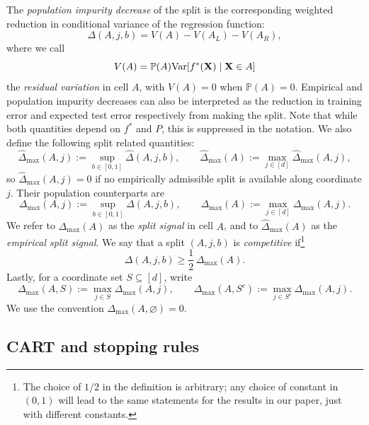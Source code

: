 \documentclass[11pt]{article}
\theoremstyle{plain}
\theoremstyle{definition}
\theoremstyle{remark}
\theoremstyle{plain}
\newcommand{\bX}{\mathbf{X}}
\renewcommand{\P}{\mathbb{P}}
\newcommand{\Var}{\textnormal{Var}}
\newcommand{\1}{\mathbbm{1}}
\begin{document}
The \emph{population impurity decrease} of the split is the corresponding weighted reduction in conditional variance of the regression function:
\begin{equation}
\label{eq:population-impurity-decrease}
\Delta(A,j,b)
=
V(A) - V(A_L) - V(A_R),
\end{equation}
where we call
\begin{equation} \label{eq:residual-variation}
    V(A)=\P(A)\Var[f^*(\bX)\mid\bX\in A]
\end{equation}
the \emph{residual variation} in cell $A$, with $V(A)=0$ when
$\P(A)=0$.
Empirical and population impurity decreases can also be interpreted as the reduction in training error and expected test error respectively from making the split.
Note that while both quantities depend on $f^*$ and $P$, this is suppressed in the notation. 
We also define the following split related quantities:
\[
\widehat\Delta_{\max}(A,j)
:=
\sup_{b\in[0,1]}\widehat\Delta(A,j,b),
\qquad
\widehat\Delta_{\max}(A)
:=
\max_{j\in[d]}\widehat\Delta_{\max}(A,j),
\]
so $\widehat\Delta_{\max}(A,j)=0$ if no empirically admissible split is
available along coordinate $j$. Their
population counterparts are
\[
\Delta_{\max}(A,j)
:=
\sup_{b\in[0,1]}\Delta(A,j,b),
\qquad
\Delta_{\max}(A)
:=
\max_{j\in[d]}\Delta_{\max}(A,j).
\]
We refer to $\Delta_{\max}(A)$ as the \emph{split signal} in cell $A$, and to $\widehat\Delta_{\max}(A)$ as the \emph{empirical split signal}.
We say that a split $(A,j,b)$ is \emph{competitive} if\footnote{The choice of $1/2$ in the definition is arbitrary; any choice of constant in $(0,1)$ will lead to the same statements for the results in our paper, just with different constants.}
\begin{equation}
\label{eq:competitive-split}
\Delta(A,j,b)\ge \frac{1}{2}\,\Delta_{\max}(A).
\end{equation}
Lastly, for a coordinate set $S\subseteq[d]$, write
\[
\Delta_{\max}(A,S):=\max_{j\in S}\Delta_{\max}(A,j),
\qquad
\Delta_{\max}(A,S^c):=\max_{j\in S^c}\Delta_{\max}(A,j).
\]
We use the convention $\Delta_{\max}(A,\varnothing)=0$.

\subsection{CART and stopping rules}
\label{section:early-CART}
\end{document}
